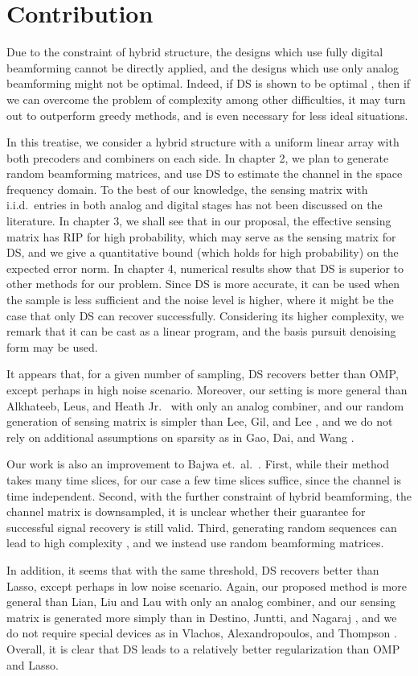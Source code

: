 \section {Contribution}

Due to the constraint of hybrid structure, the designs which use fully digital beamforming cannot be directly applied, and the designs which use only analog beamforming might not be optimal.
Indeed, if DS is shown to be optimal \cite {CaT07}, then if we can overcome the problem of complexity among other difficulties, it may turn out to outperform greedy methods, and is even necessary for less ideal situations.

In this treatise, we consider a hybrid structure with a uniform linear array with both precoders and combiners on each side.
In chapter 2, we plan to generate random beamforming matrices, and use DS to estimate the channel in the space frequency domain.
To the best of our knowledge, the sensing matrix with i.i.d.\ entries in both analog and digital stages has not been discussed on the literature.
In chapter 3, we shall see that in our proposal, the effective sensing matrix has RIP for high probability, which may serve as the sensing matrix for DS,
and we give a quantitative bound (which holds for high probability) on the expected error norm.
In chapter 4, numerical results show that DS is superior to other methods for our problem.
Since DS is more accurate, it can be used when the sample is less sufficient and the noise level is higher, where it might be the case that only DS can recover successfully.
Considering its higher complexity, we remark that it can be cast as a linear program, and the basis pursuit denoising form may be used.

It appears that, for a given number of sampling, DS recovers better than OMP, except perhaps in high noise scenario.
Moreover, our setting is more general than Alkhateeb, Leus, and Heath Jr.\ \cite {ALH15} with only an analog combiner,
and our random generation of sensing matrix is simpler than Lee, Gil, and Lee \cite {LGL16},
and we do not rely on additional assumptions on sparsity as in Gao, Dai, and Wang \cite {GDW15}.

Our work is also an improvement to Bajwa et.\ al.\ \cite {BHS10}.
First, while their method takes many time slices, for our case a few time slices suffice, since the channel is time independent.
Second, with the further constraint of hybrid beamforming, the channel matrix is downsampled, it is unclear whether their guarantee for successful signal recovery is still valid.
Third, generating random sequences can lead to high complexity \cite {LGL16}, and we instead use random beamforming matrices.

In addition, it seems that with the same threshold, DS recovers better than Lasso, except perhaps in low noise scenario.
Again, our proposed method is more general than Lian, Liu and Lau \cite {LLL17} with only an analog combiner,
and our sensing matrix is generated more simply than in Destino, Juntti, and Nagaraj \cite {DJN15},
and we do not require special devices as in Vlachos, Alexandropoulos, and Thompson \cite {VAT19}.
Overall, it is clear that DS leads to a relatively better regularization than OMP and Lasso.

